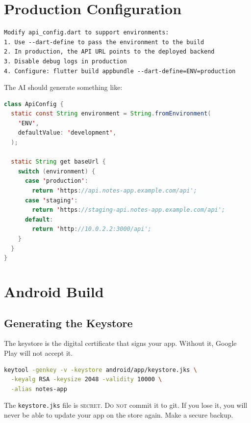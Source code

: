 \section{Production Configuration}

\begin{praticabox}[title={Hands-on --- Production environment}]
\begin{lstlisting}[language={}]
Modify api_config.dart to support environments:
1. Use --dart-define to pass the environment to the build
2. In production, the API URL points to the deployed backend
3. Disable debug logs in production
4. Configure: flutter build appbundle --dart-define=ENV=production
\end{lstlisting}
\end{praticabox}

The AI should generate something like:

\begin{lstlisting}[language=Java,title={ApiConfig with environments}]
class ApiConfig {
  static const String environment = String.fromEnvironment(
    'ENV',
    defaultValue: 'development',
  );

  static String get baseUrl {
    switch (environment) {
      case 'production':
        return 'https://api.notes-app.example.com/api';
      case 'staging':
        return 'https://staging-api.notes-app.example.com/api';
      default:
        return 'http://10.0.2.2:3000/api';
    }
  }
}
\end{lstlisting}

\section{Android Build}

\subsection{Generating the Keystore}

The keystore is the digital certificate that signs your app. Without it, Google Play will not accept it.

\begin{lstlisting}[language=bash]
keytool -genkey -v -keystore android/app/keystore.jks \
  -keyalg RSA -keysize 2048 -validity 10000 \
  -alias notes-app
\end{lstlisting}

\begin{warnbox}
The \texttt{keystore.jks} file is \textsc{secret}. \textsc{Do not} commit it to git. If you lose it, you will never be able to update your app on the store again. Make a secure backup.
\end{warnbox}

